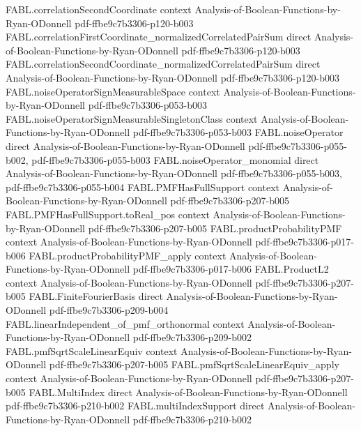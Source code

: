 \begin{theorem}
\proofstep
  {FABL.correlationSecondCoordinate}
  {context}
  {Analysis-of-Boolean-Functions-by-Ryan-ODonnell}
  {pdf-ffbe9c7b3306-p120-b003}
\proofstep
  {FABL.correlationFirstCoordinate_normalizedCorrelatedPairSum}
  {direct}
  {Analysis-of-Boolean-Functions-by-Ryan-ODonnell}
  {pdf-ffbe9c7b3306-p120-b003}
\proofstep
  {FABL.correlationSecondCoordinate_normalizedCorrelatedPairSum}
  {direct}
  {Analysis-of-Boolean-Functions-by-Ryan-ODonnell}
  {pdf-ffbe9c7b3306-p120-b003}
\proofstep
  {FABL.noiseOperatorSignMeasurableSpace}
  {context}
  {Analysis-of-Boolean-Functions-by-Ryan-ODonnell}
  {pdf-ffbe9c7b3306-p053-b003}
\proofstep
  {FABL.noiseOperatorSignMeasurableSingletonClass}
  {context}
  {Analysis-of-Boolean-Functions-by-Ryan-ODonnell}
  {pdf-ffbe9c7b3306-p053-b003}
\proofstep
  {FABL.noiseOperator}
  {direct}
  {Analysis-of-Boolean-Functions-by-Ryan-ODonnell}
  {pdf-ffbe9c7b3306-p055-b002,
    pdf-ffbe9c7b3306-p055-b003}
\proofstep
  {FABL.noiseOperator_monomial}
  {direct}
  {Analysis-of-Boolean-Functions-by-Ryan-ODonnell}
  {pdf-ffbe9c7b3306-p055-b003,
    pdf-ffbe9c7b3306-p055-b004}
\proofstep
  {FABL.PMFHasFullSupport}
  {context}
  {Analysis-of-Boolean-Functions-by-Ryan-ODonnell}
  {pdf-ffbe9c7b3306-p207-b005}
\proofstep
  {FABL.PMFHasFullSupport.toReal_pos}
  {context}
  {Analysis-of-Boolean-Functions-by-Ryan-ODonnell}
  {pdf-ffbe9c7b3306-p207-b005}
\proofstep
  {FABL.productProbabilityPMF}
  {context}
  {Analysis-of-Boolean-Functions-by-Ryan-ODonnell}
  {pdf-ffbe9c7b3306-p017-b006}
\proofstep
  {FABL.productProbabilityPMF_apply}
  {context}
  {Analysis-of-Boolean-Functions-by-Ryan-ODonnell}
  {pdf-ffbe9c7b3306-p017-b006}
\proofstep
  {FABL.ProductL2}
  {context}
  {Analysis-of-Boolean-Functions-by-Ryan-ODonnell}
  {pdf-ffbe9c7b3306-p207-b005}
\proofstep
  {FABL.FiniteFourierBasis}
  {direct}
  {Analysis-of-Boolean-Functions-by-Ryan-ODonnell}
  {pdf-ffbe9c7b3306-p209-b004}
\proofstep
  {FABL.linearIndependent_of_pmf_orthonormal}
  {context}
  {Analysis-of-Boolean-Functions-by-Ryan-ODonnell}
  {pdf-ffbe9c7b3306-p209-b002}
\proofstep
  {FABL.pmfSqrtScaleLinearEquiv}
  {context}
  {Analysis-of-Boolean-Functions-by-Ryan-ODonnell}
  {pdf-ffbe9c7b3306-p207-b005}
\proofstep
  {FABL.pmfSqrtScaleLinearEquiv_apply}
  {context}
  {Analysis-of-Boolean-Functions-by-Ryan-ODonnell}
  {pdf-ffbe9c7b3306-p207-b005}
\proofstep
  {FABL.MultiIndex}
  {direct}
  {Analysis-of-Boolean-Functions-by-Ryan-ODonnell}
  {pdf-ffbe9c7b3306-p210-b002}
\proofstep
  {FABL.multiIndexSupport}
  {direct}
  {Analysis-of-Boolean-Functions-by-Ryan-ODonnell}
  {pdf-ffbe9c7b3306-p210-b002}

\end{theorem}
